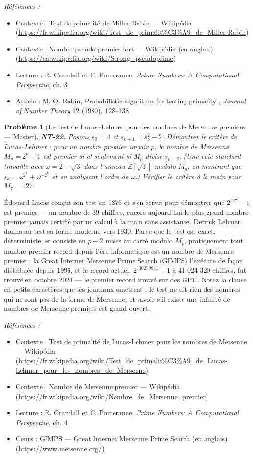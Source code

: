 \documentclass[11pt]{article}
\newtheorem{problem}{Problème}
\newenvironment{refs}{\par\small\noindent\emph{Références :}\begin{itemize}\setlength\itemsep{0pt}}{\end{itemize}\normalsize}
\begin{document}
\begin{refs}
\item Contexte : Test de primalité de Miller-Rabin --- Wikipédia (\url{https://fr.wikipedia.org/wiki/Test_de_primalit%C3%A9_de_Miller-Rabin})
\item Contexte : Nombre pseudo-premier fort --- Wikipédia (en anglais) (\url{https://en.wikipedia.org/wiki/Strong_pseudoprime})
\item Lecture : R. Crandall et C. Pomerance, \textit{Prime Numbers: A Computational Perspective}, ch. 3
\item Article : M. O. Rabin, \og{} Probabilistic algorithm for testing primality \fg{}, \textit{Journal of Number Theory} 12 (1980), 128--138
\end{refs}

\bigskip

\begin{problem}[{Le test de Lucas--Lehmer pour les nombres de Mersenne premiers --- Master}]
\textbf{NT-22.} Posons $s_0 = 4$ et $s_{k+1} = s_k^2 - 2$.
Démontrer le critère de Lucas--Lehmer : pour un nombre premier impair $p$, le nombre de Mersenne
$M_p = 2^p - 1$ est premier si et seulement si $M_p$ divise $s_{p-2}$. (Une voie
standard travaille avec $\omega = 2 + \sqrt{3}$ dans l'anneau $\mathbb{Z}[\sqrt{3}]$ modulo
$M_p$, en montrant que $s_k = \omega^{2^k} + \omega^{-2^k}$ et en analysant l'ordre de
$\omega$.) Vérifier le critère à la main pour $M_7 = 127$.
\end{problem}

\noindent Édouard Lucas conçut son test en 1876 et s'en servit pour démontrer que
$2^{127} - 1$ est premier --- un nombre de 39 chiffres, encore aujourd'hui le plus grand nombre
premier jamais certifié par un calcul à la main sans assistance. Derrick Lehmer donna au test sa
forme moderne vers 1930. Parce que le test est exact, déterministe, et consiste en $p - 2$ mises au
carré modulo $M_p$, pratiquement tout nombre premier record depuis l'ère informatique est un
nombre de Mersenne premier : la Great Internet Mersenne Prime Search (GIMPS) l'exécute de façon
distribuée depuis 1996, et le record actuel, $2^{136279841} - 1$ à 41 024 320 chiffres, fut
trouvé en octobre 2024 --- le premier record trouvé sur des GPU. Notez la clause en petits caractères
que les journaux omettent : le test ne dit rien des nombres qui ne sont pas de la forme de Mersenne,
et savoir s'il existe une infinité de nombres de Mersenne premiers est grand ouvert.

\begin{refs}
\item Contexte : Test de primalité de Lucas-Lehmer pour les nombres de Mersenne --- Wikipédia (\url{https://fr.wikipedia.org/wiki/Test_de_primalit%C3%A9_de_Lucas-Lehmer_pour_les_nombres_de_Mersenne})
\item Contexte : Nombre de Mersenne premier --- Wikipédia (\url{https://fr.wikipedia.org/wiki/Nombre_de_Mersenne_premier})
\item Lecture : R. Crandall et C. Pomerance, \textit{Prime Numbers: A Computational Perspective}, ch. 4
\item Cours : GIMPS --- Great Internet Mersenne Prime Search (en anglais) (\url{https://www.mersenne.org/})
\end{refs}
\end{document}
